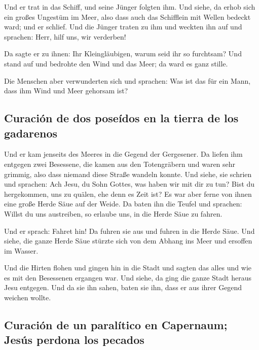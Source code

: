 Und er trat in das Schiff, und seine Jünger folgten ihm.
 Und siehe, da erhob sich ein großes Ungestüm im Meer,
also dass auch das Schifflein mit Wellen bedeckt ward; und er schlief.
 Und die Jünger traten zu ihm und weckten ihn auf und
sprachen: Herr, hilf uns, wir verderben!

 Da sagte er zu ihnen: Ihr Kleingläubigen, warum seid ihr
so furchtsam? Und stand auf und bedrohte den Wind und das Meer; da ward
es ganz stille.

 Die Menschen aber verwunderten sich und sprachen: Was
ist das für ein Mann, dass ihm Wind und Meer gehorsam ist?

\hypertarget{curaciuxf3n-de-dos-poseuxeddos-en-la-tierra-de-los-gadarenos}{%
\subsection{Curación de dos poseídos en la tierra de los
gadarenos}\label{curaciuxf3n-de-dos-poseuxeddos-en-la-tierra-de-los-gadarenos}}

 Und er kam jenseits des Meeres in die Gegend der
Gergesener. Da liefen ihm entgegen zwei Besessene, die kamen aus den
Totengräbern und waren sehr grimmig, also dass niemand diese Straße
wandeln konnte.  Und siehe, sie schrien und sprachen: Ach
Jesu, du Sohn Gottes, was haben wir mit dir zu tun? Bist du hergekommen,
uns zu quälen, ehe denn es Zeit ist?  Es war aber ferne
von ihnen eine große Herde Säue auf der Weide.  Da baten
ihn die Teufel und sprachen: Willst du uns austreiben, so erlaube uns,
in die Herde Säue zu fahren.

 Und er sprach: Fahret hin! Da fuhren sie aus und fuhren
in die Herde Säue. Und siehe, die ganze Herde Säue stürzte sich von dem
Abhang ins Meer und ersoffen im Wasser.

 Und die Hirten flohen und gingen hin in die Stadt und
sagten das alles und wie es mit den Besessenen ergangen war.
 Und siehe, da ging die ganze Stadt heraus Jesu entgegen.
Und da sie ihn sahen, baten sie ihn, dass er aus ihrer Gegend weichen
wollte.

\hypertarget{curaciuxf3n-de-un-paraluxedtico-en-capernaum-jesuxfas-perdona-los-pecados}{%
\subsection{Curación de un paralítico en Capernaum; Jesús perdona los
pecados}\label{curaciuxf3n-de-un-paraluxedtico-en-capernaum-jesuxfas-perdona-los-pecados}}

